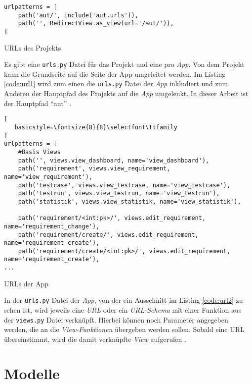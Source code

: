 \documentclass[11pt,a4paper]{report}
\begin{document}
\begin{listing}[htbp]
\begin{lstlisting}
urlpatterns = [
    path('aut/', include('aut.urls')),
    path('', RedirectView.as_view(url='/aut/')),
]
\end{lstlisting}
\caption{URLs des Projekts}
\label{code:url1}
\end{listing}

Es gibt eine \verb|urls.py| Datei für das Projekt und eine pro \textit{App}. Von dem Projekt kann die Grundseite auf die Seite der App umgeleitet werden. Im Listing \ref{code:url1} wird zum einen die \verb|urls.py| Datei der \textit{App} inkludiert und zum Anderen der Hauptpfad des Projekts auf die \textit{App} umgelenkt. In dieser Arbeit ist der Hauptpfad "`aut"' \cite{mozillatuto5} .




\begin{listing}[htbp]
\begin{lstlisting}[
   basicstyle=\fontsize{8}{8}\selectfont\ttfamily
]
urlpatterns = [
    #Basis Views
    path('', views.view_dashboard, name='view_dashboard'),
    path('requirement', views.view_requirement, name='view_requirement'),
    path('testcase', views.view_testcase, name='view_testcase'),
    path('testrun', views.view_testrun, name='view_testrun'),
    path('statistik', views.view_statistik, name='view_statistik'),

    path('requirement/<int:pk>/', views.edit_requirement, name='requirement_change'),
    path('requirement/create/', views.edit_requirement, name='requirement_create'),
    path('requirement/create/<int:pk>/', views.edit_requirement, name='requirement_create'),
...
\end{lstlisting}
\caption{URLs der App}
\label{code:url2}
\end{listing}


In der \verb|urls.py| Datei der \textit{App}, von der ein Ausschnitt im Listing \ref{code:url2} zu sehen ist, wird jeweils eine \textit{URL} oder ein \textit{URL-Schema} mit einer Funktion aus der \verb|views.py| Datei verknüpft. Hierbei können noch Parameter angegeben werden, die an die \textit{View-Funktionen} übergeben werden sollen. Sobald eine URL übereinstimmt, wird die damit verknüpfte \textit{View} aufgerufen \cite{djangotuto1}.


\section{Modelle}
\end{document}
